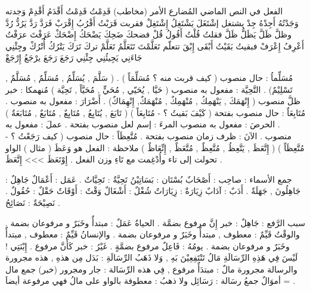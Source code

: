 \documentclass[a4paper]{article}
\begin{document}
\begin{flushright}
الفعل في النص      الماضي    المُضارع      الأمر     (مخاطب)
      قَدِمْتُ          قَدِمْتُ     أَقْدَمُ             أَقْدِمْ
     وَجدته          وَجَدْتُهُ    أَجِدْهُ             جِدْ
      يشتغل            إشْتَغَلَ      يَشْتَغِلُ             إِشْتَغِلْ
      فقربت            قَرَبْتُ       أَقْرُبُ             إِقْرَبْ
      فَرَدَّ               رَدَّ          يَرُدُّ               رُدَّ
      وظلَّ              ظَلَّ         يَظَلُّ              ظَلَّ
      فقلتُ              قُلْتُ         أَقُولُ              قُلْ
      فضحكَ           ضَحِكَ       يَضْحَكُ           إِضْحَكْ
      عَرَفْتَ         عرَفْتُ         أَعْرِفُ            إِعْرَفْ
      فبقيتُ             بَقَيْتُ        أَبْقَى              إِبْقَ
تتعلّم              تَعَلَّمْتَ      تَتَعَلَّمُ              تَعَلَّمْ
تركَ              تَرَكَ        يَتْرُكُ             أُتْرُكْ
وجِئْنِي            جَاءَنِي      يَجِيئُنِي            جِئْنِي
رَجَعَ              رَجَعَ        يرْجَعُ             إِرْجَعْ


مُسَلِّماُ : حال منصوب ( كيف قربت منه ؟ مُسَلِّمَاً ) .
      ( سَلَّمَ , يُسَلِّمُ , مُسَلِّمٌ , مُسَلَّمٌ , تَسْلِيْمٌ) .
التَّحِيَّة : مفعول به منصوب ( حَيَّا , يُحَيّي , مُحَيٍّ , مُحَيَّاً , تَحِيَّة )
مُنهمكا : خبر ظلَّ منصوب ( إِنْهَمَكَ , يَنْهَمِكُ , مُنْهَمِكٌ , مُنْهَمَكٌ, إِنْهِمَاكٌ) .
أَضْرَارَ : مفعول به منصوب .
مُتَابِعَاٌ : حال منصوب بفتحة ( كَيْفَ بَقيتُ ؟ - مُتَابِعَاً )
      ( تَابَعَ , يُتَابِعُ , مُتَابِعٌ , مُتَابَعٌ , مُتَابَعَةٌ ) .
الحرصَ : مفعول به منصوب
المرءَ : إسم لعل منصوب بفتحة .
عملَ : مفعول به منصوب .
الآنَ : ظرف زمان منصوب بفتحة .
مُتَّعِظَاً : حال منصوب ( كيف رَجَعْتُ ؟ - مُتَّعِظَاً )
      ( إِتَّعَظَ , يَتَّعِظُ , مُتَّعِظٌ , مُتَّعَظٌ , إِتِّعَاظٌ )
      ملاحظة : الفعل هو وَعَظَ ( مثال ) الواو تحولت إلى تاء وأُدْغِمت مع
                  تَاءِ وزن الفعل . إِوْتَعَظَ >>> إِتَّعَظَ .

جمع الأسماء :
صاحِب : أَصْحَابٌ
بُسْتَان : بَسَاتِيْنُ
تَحِيَّةٌ : تَحِيَّاتٌ .
عَمَل : أَعْمَالٌ
جَاهِلٌ : جَاهِلُونَ , جَهَلَةٌ .
أَدَبٌ : آدَابٌ
زِيَارَةٌ : زِيَارَاتٌ
شُغْلٌ : أَشْغَالٌ
وَقْتٌ : أَوْقَاتٌ
حَقْلٌ : حُقُولٌ .
نَصِيْحَةٌ : نَصَائِحُ .

سبب الرَّفع :
جَاهِلٌ : خبر إِنَّ مرفوع بضمَّة .
الحياةُ عَمَلٌ : مبتدأٌ وخَبَرٌ و مرفوعان بضمة .
والوقْتُ قَيِّمٌ : معطوف , مبتدأٌ وخَبَرٌ و مرفوعان بضمة .
والإنسانُ قَيِّمٌ : معطوف , مبتدأٌ وخَبَرٌ و مرفوعان بضمة .
يومُهُ : فَاعِلٌ مرفوع بضمَّةٍ .
غَيْرُ : خبر كَأَنَّ مرفوع .
إِبْنَتِي ! لَيْسَ فِي هَذِهِ الرِّسَالَةِ مَالُ تَنْتَفِعِيْنَ بَهِ , وَلا ذَهَبُ
الرِّسَالَةِ : بَدَل مِن هذهِ , هذه مجرورة والرسالة مجرورة
مالٌ : مبتدَأٌ مرفوع , فِي هذه الرِّسَالة : جار ومجرور (خبر)
      جمع مال = أموَالٌ       جمعُ رسَالة : رَسَائِل
ولا ذهبُ : معطوفة بالواو على مالُ فهي مرفوعة أيضاَ .



\end{flushright}
\end{document}
